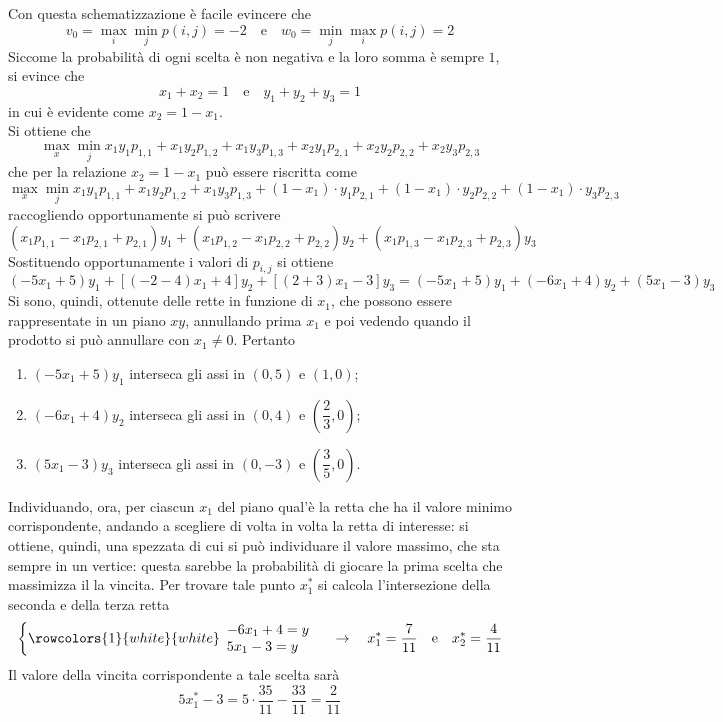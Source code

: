 \documentclass[a4paper]{extarticle}
\begin{document}
\vspace{1em}
\noindent
Con questa schematizzazione è facile evincere che
\[v_0 = \underset{i}{\max} \underset{j}{\min} p(i,j) = -2 \hspace{1em} \text{e} \hspace{1em} w_0 = \underset{j}{\min} \underset{i}{\max} p(i,j) = 2\]
Siccome la probabilità di ogni scelta è non negativa e la loro somma è sempre $1$, si evince che
\[x_1+x_2=1 \hspace{1em} \text{e} \hspace{1em} y_1+y_2+y_3=1\]
in cui è evidente come $x_2=1-x_1$.\\
Si ottiene che
\[\underset{x}{\max} \underset{j}{\min} x_1 y_1 p_{1,1} + x_1 y_2 p_{1,2} + x_1 y_3 p_{1,3} + x_2 y_1 p_{2,1} + x_2 y_2 p_{2,2} + x_2 y_3 p_{2,3}\]
che per la relazione $x_2=1-x_1$ può essere riscritta come
\[\underset{x}{\max} \underset{j}{\min} x_1 y_1 p_{1,1} + x_1 y_2 p_{1,2} + x_1 y_3 p_{1,3} + (1-x_1) \cdot y_1 p_{2,1} + (1-x_1) \cdot y_2 p_{2,2} + (1-x_1) \cdot y_3 p_{2,3}\]
raccogliendo opportunamente si può scrivere
\[(x_1 p_{1,1} - x_1 p_{2,1} + p_{2,1}) y_1 + (x_1 p_{1,2} - x_1 p_{2,2} + p_{2,2}) y_2 + (x_1 p_{1,3} - x_1 p_{2,3} + p_{2,3}) y_3\]
Sostituendo opportunamente i valori di $p_{i,j}$ si ottiene
\[(-5 x_1 +5) y_1 + \left[(-2-4) x_1 + 4\right] y_2 + \left[(2+3) x_1 - 3\right] y_3 = (-5x_1 + 5) y_1 + (-6x_1 + 4) y_2 + (5x_1-3)y_3\]
Si sono, quindi, ottenute delle rette in funzione di $x_1$, che possono essere rappresentate in un piano $xy$, annullando prima $x_1$ e poi vedendo quando il prodotto si può annullare con $x_1 \neq 0$. Pertanto
\begin{enumerate}
    \item $(-5 x_1 +5) y_1$ interseca gli assi in $(0,5)$ e $(1,0)$;
    \item $(-6x_1 + 4) y_2$ interseca gli assi in $(0,4)$ e $\left(\dfrac{2}{3},0\right)$;
    \item $(5x_1-3) y_3$ interseca gli assi in $(0,-3)$ e $\left(\dfrac{3}{5},0\right)$.
\end{enumerate}
Individuando, ora, per ciascun $x_1$ del piano qual'è la retta che ha il valore minimo corrispondente, andando a scegliere di volta in volta la retta di interesse: si ottiene, quindi, una spezzata di cui si può individuare il valore massimo, che sta sempre in un vertice: questa sarebbe la probabilità di giocare la prima scelta che massimizza il la vincita. Per trovare tale punto $x_1^*$ si calcola l'intersezione della seconda e della terza retta
\[
    \left\{
        \rowcolors{1}{white}{white}
        \begin{array}{l}
            -6x_1+4=y\\
            5x_1-3=y
        \end{array}
    \right. \hspace{1em} \rightarrow \hspace{1em} x_1^*=\dfrac{7}{11} \hspace{1em} \text{e} \hspace{1em} x_2^*=\dfrac{4}{11}
\]
Il valore della vincita corrispondente a tale scelta sarà
\[5x_1^*-3=5 \cdot \dfrac{35}{11}-\dfrac{33}{11} = \dfrac{2}{11}\]
\end{document}
